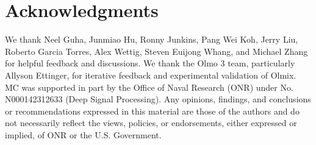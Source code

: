 \section*{Acknowledgments}

We thank Neel Guha, Junmiao Hu, Ronny Junkins, Pang Wei Koh, Jerry Liu, Roberto Garcia Torres, Alex Wettig, Steven Euijong Whang, and Michael Zhang for helpful feedback and discussions. 
We thank the Olmo 3 team, particularly Allyson Ettinger, for iterative feedback and experimental validation of Olmix.
MC was supported in part by the Office of Naval Research (ONR) under No. N000142312633 (Deep Signal Processing). Any opinions, findings, and conclusions or recommendations expressed in this material are those of the authors and do not necessarily reflect the views, policies, or endorsements, either expressed or implied, of ONR or the U.S. Government.